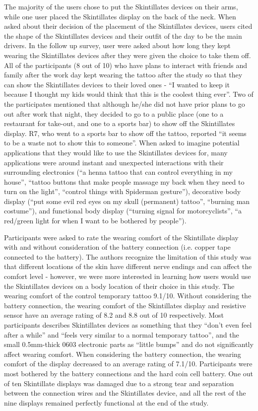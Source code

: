 \documentclass{sigchi}
\begin{document}
The majority of the users chose to put the Skintillates devices on their arms, while one user placed the Skintillates display on the back of the neck. When asked about their decision of the placement of the Skintillates devices, users cited the shape of the Skintillates devices and their outfit of the day to be the main drivers. In the follow up survey, user were asked about how long they kept wearing the Skintillates devices after they were given the choice to take them off. All of the participants (8 out of 10) who have plans to interact with friends and family after the work day kept wearing the tattoo after the study so that they can show the Skintillates devices to their loved ones - ``I wanted to keep it because I thought my kids would think that this is the coolest thing ever''. Two of the participates mentioned that although he/she did not have prior plans to go out after work that night, they decided to go to a public place (one to a restaurant for take-out, and one to a sports bar) to show off the Skintillates display. R7, who went to a sports bar to show off the tattoo, reported ``it seems to be a waste not to show this to someone''. When asked to imagine potential applications that they would like to use the Skintillates devices for, many applications were around instant and unexpected interactions with their surrounding electronics (``a henna tattoo that can control everything in my house'', ``tattoo buttons that make people massage my back when they need to turn on the light'', ``control things with Spiderman gesture''), decorative body display (``put some evil red eyes on my skull (permanent) tattoo'', ``burning man costume''), and functional body display (``turning signal for motorcyclists'', ``a red/green light for when I want to be bothered by people''). 

Participants were asked to rate the wearing comfort of the Skintillate display with and without consideration of the battery connection (i.e. copper tape connected to the battery). The authors recognize the limitation of this study was that different locations of the skin have different nerve endings and can affect the comfort level - however, we were more interested in learning how users would use the Skintillates devices on a body location of their choice in this study. The wearing comfort of the control temporary tattoo 9.1/10. Without considering the battery connection, the wearing comfort of the Skintillates display and resistive sensor have an average rating of 8.2 and 8.8 out of 10 respectively. Most participants describes Skintillates devices as something that they ``don't even feel after a while'' and ``feels very similar to a normal temporary tattoo'', and the small 0.5mm-thick 0603 electronic parts as ``little bumps'' and do not significantly affect wearing comfort. When considering the battery connection, the wearing comfort of the display decreased to an average rating of 7.1/10. Participants were most bothered by the battery connections and the hard coin cell battery. One out of ten Skintillate displays was damaged due to a strong tear and separation between the connection wires and the Skintillates device, and all the rest of the nine displays remained perfectly functional at the end of the study.
\end{document}
